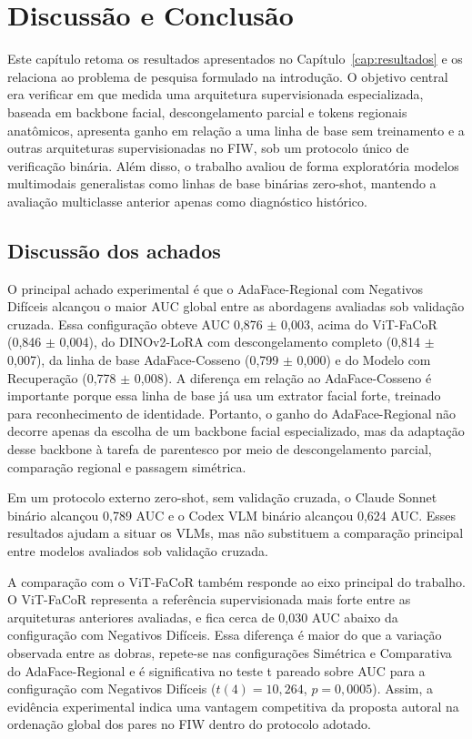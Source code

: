 \chapter[Discussão e Conclusão]{Discussão e Conclusão}
\label{cap:conclusao}

Este capítulo retoma os resultados apresentados no Capítulo~\ref{cap:resultados} e os relaciona ao problema de pesquisa formulado na introdução. O objetivo central era verificar em que medida uma arquitetura supervisionada especializada, baseada em backbone facial, descongelamento parcial e tokens regionais anatômicos, apresenta ganho em relação a uma linha de base sem treinamento e a outras arquiteturas supervisionadas no FIW, sob um protocolo único de verificação binária. Além disso, o trabalho avaliou de forma exploratória modelos multimodais generalistas como linhas de base binárias zero-shot, mantendo a avaliação multiclasse anterior apenas como diagnóstico histórico.

\section{Discussão dos achados}

O principal achado experimental é que o AdaFace-Regional com Negativos Difíceis alcançou o maior AUC global entre as abordagens avaliadas sob validação cruzada. Essa configuração obteve AUC 0,876 $\pm$ 0,003, acima do ViT-FaCoR (0,846 $\pm$ 0,004), do DINOv2-LoRA com descongelamento completo (0,814 $\pm$ 0,007), da linha de base AdaFace-Cosseno (0,799 $\pm$ 0,000) e do Modelo com Recuperação (0,778 $\pm$ 0,008). A diferença em relação ao AdaFace-Cosseno é importante porque essa linha de base já usa um extrator facial forte, treinado para reconhecimento de identidade. Portanto, o ganho do AdaFace-Regional não decorre apenas da escolha de um backbone facial especializado, mas da adaptação desse backbone à tarefa de parentesco por meio de descongelamento parcial, comparação regional e passagem simétrica.

Em um protocolo externo zero-shot, sem validação cruzada, o Claude Sonnet binário alcançou 0,789 AUC e o Codex VLM binário alcançou 0,624 AUC. Esses resultados ajudam a situar os VLMs, mas não substituem a comparação principal entre modelos avaliados sob validação cruzada.

A comparação com o ViT-FaCoR também responde ao eixo principal do trabalho. O ViT-FaCoR representa a referência supervisionada mais forte entre as arquiteturas anteriores avaliadas, e fica cerca de 0,030 AUC abaixo da configuração com Negativos Difíceis. Essa diferença é maior do que a variação observada entre as dobras, repete-se nas configurações Simétrica e Comparativa do AdaFace-Regional e é significativa no teste t pareado sobre AUC para a configuração com Negativos Difíceis ($t(4)=10{,}264$, $p=0{,}0005$). Assim, a evidência experimental indica uma vantagem competitiva da proposta autoral na ordenação global dos pares no FIW dentro do protocolo adotado.

